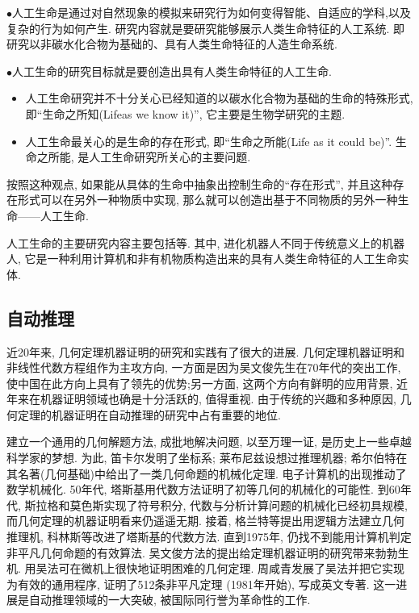 $\bullet$人工生命是通过对自然现象的模拟来研究行为如何变得智能、自适应的学科,以及复杂的行为如何产生. 研究内容就是要研究能够展示人类生命特征的人工系统. 即研究以非碳水化合物为基础的、具有人类生命特征的人造生命系统.

$\bullet$人工生命的研究目标就是要创造出具有人类生命特征的人工生命.
\begin{itemize}
\item 人工生命研究并不十分关心已经知道的以碳水化合物为基础的生命的特殊形式, 即“生命之所知(Lifeas we know it)”, 它主要是生物学研究的主题.
\item 人工生命最关心的是生命的存在形式, 即“生命之所能(Life as it could be)”. 生命之所能, 是人工生命研究所关心的主要问题.
\end{itemize}
按照这种观点, 如果能从具体的生命中抽象出控制生命的“存在形式”, 并且这种存在形式可以在另外一种物质中实现, 那么就可以创造出基于不同物质的另外一种生命——人工生命.

人工生命的主要研究内容主要包括等. 其中, 进化机器人不同于传统意义上的机器人, 它是一种利用计算机和非有机物质构造出来的具有人类生命特征的人工生命实体.

\subsection{自动推理}
近20年来, 几何定理机器证明的研究和实践有了很大的进展. 几何定理机器证明和非线性代数方程组作为主攻方向, 一方面是因为吴文俊先生在70年代的突出工作, 使中国在此方向上具有了领先的优势;另一方面, 这两个方向有鲜明的应用背景, 近年来在机器证明领域也确是十分活跃的, 值得重视. 由于传统的兴趣和多种原因, 几何定理的机器证明在自动推理的研究中占有重要的地位.

建立一个通用的几何解题方法, 成批地解决问题, 以至万理一证, 是历史上一些卓越科学家的梦想. 为此, 笛卡尔发明了坐标系; 莱布尼兹设想过推理机器; 希尔伯特在其名著(几何基础)中给出了一类几何命题的机械化定理. 电子计算机的出现推动了数学机械化. 50年代, 塔斯基用代数方法证明了初等几何的机械化的可能性. 到60年代, 斯拉格和莫色斯实现了符号积分, 代数与分析计算问题的机械化已经初具规模, 而几何定理的机器证明看来仍遥遥无期. 接着, 格兰特等提出用逻辑方法建立几何推理机, 科林斯等改进了塔斯基的代数方法. 直到1975年, 仍找不到能用计算机判定非平凡几何命题的有效算法. 吴文俊方法的提出给定理机器证明的研究带来勃勃生机. 用吴法可在微机上很快地证明困难的几何定理. 周咸青发展了吴法并把它实现为有效的通用程序, 证明了512条非平凡定理 (1981年开始), 写成英文专著. 这一进展是自动推理领域的一大突破, 被国际同行誉为革命性的工作.

